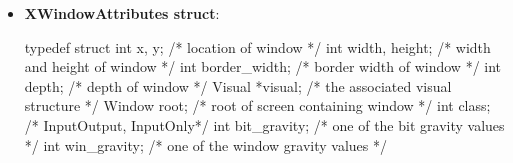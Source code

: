 \documentclass{report}
\begin{document}
\begin{itemize}
\begin{cppcode}
                Status XReconfigureWMWindow(Display* display, Window w, int screen_number, unsigned int value_mask, XWindowChanges* values)
            \end{cppcode}
            \bigbreak \noindent
            Reconfigures a top-level window through the window manager when the window is managed.
            \begin{itemize}
                \item display Specifies the connection to the X server.
                \item $w$ Specifies the window.
                \item screen\_number Specifies the appropriate screen number on the host server.
                \item value\_mask Specifies which values are to be set using information in the values structure.
                \item This mask is the bitwise inclusive OR of the valid configure window values bits.
                \item values Specifies the XWindowChanges structure.
            \end{itemize}
            \begin{itemize}
                \item \textbf{Possible errors}: \texttt{BadValue}, \texttt{BadWindow}.
                \item \textbf{Possible Status identifiers}: \texttt{True}, \texttt{False}.
            \end{itemize}
        \item \textbf{XWindowAttributes struct}:             
            \bigbreak \noindent 
            \begin{cppcode}
                typedef struct {
                    int x, y;                           /* location of window */
                    int width, height;                  /* width and height of window */
                    int border_width;                   /* border width of window */
                    int depth;                          /* depth of window */
                    Visual *visual;                     /* the associated visual structure */
                    Window root;                        /* root of screen containing window */
                    int class;                          /* InputOutput, InputOnly*/
                    int bit_gravity;                    /* one of the bit gravity values */
                    int win_gravity;                    /* one of the window gravity values */
}
\end{cppcode}
\end{itemize}
\end{document}
